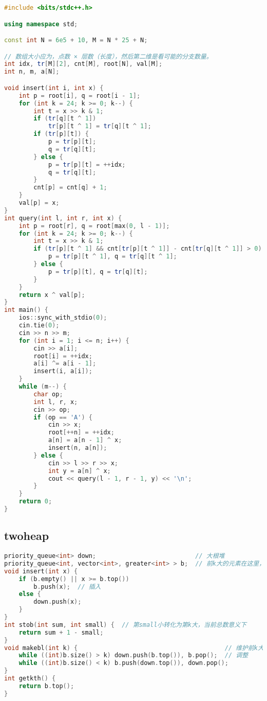 \begin{lstlisting}[language=C++]
#include <bits/stdc++.h>

using namespace std;

const int N = 6e5 + 10, M = N * 25 + N;

// 数组大小应为，点数 × 层数（长度），然后第二维是看可能的分支数量。
int idx, tr[M][2], cnt[M], root[N], val[M];
int n, m, a[N];

void insert(int i, int x) {
    int p = root[i], q = root[i - 1];
    for (int k = 24; k >= 0; k--) {
        int t = x >> k & 1;
        if (tr[q][t ^ 1])
            tr[p][t ^ 1] = tr[q][t ^ 1];
        if (tr[p][t]) {
            p = tr[p][t];
            q = tr[q][t];
        } else {
            p = tr[p][t] = ++idx;
            q = tr[q][t];
        }
        cnt[p] = cnt[q] + 1;
    }
    val[p] = x;
}
int query(int l, int r, int x) {
    int p = root[r], q = root[max(0, l - 1)];
    for (int k = 24; k >= 0; k--) {
        int t = x >> k & 1;
        if (tr[p][t ^ 1] && cnt[tr[p][t ^ 1]] - cnt[tr[q][t ^ 1]] > 0) {
            p = tr[p][t ^ 1], q = tr[q][t ^ 1];
        } else {
            p = tr[p][t], q = tr[q][t];
        }
    }
    return x ^ val[p];
}
int main() {
    ios::sync_with_stdio(0);
    cin.tie(0);
    cin >> n >> m;
    for (int i = 1; i <= n; i++) {
        cin >> a[i];
        root[i] = ++idx;
        a[i] ^= a[i - 1];
        insert(i, a[i]);
    }
    while (m--) {
        char op;
        int l, r, x;
        cin >> op;
        if (op == 'A') {
            cin >> x;
            root[++n] = ++idx;
            a[n] = a[n - 1] ^ x;
            insert(n, a[n]);
        } else {
            cin >> l >> r >> x;
            int y = a[n] ^ x;
            cout << query(l - 1, r - 1, y) << '\n';
        }
    }
    return 0;
}
\end{lstlisting}
\subsection{twoheap}
\begin{lstlisting}[language=C++]
priority_queue<int> down;                           // 大根堆
priority_queue<int, vector<int>, greater<int> > b;  // 前k大的元素在这里，第k大在堆顶
void insert(int x) {
    if (b.empty() || x >= b.top())
        b.push(x);  // 插入
    else {
        down.push(x);
    }
}
int stob(int sum, int small) {  // 第small小转化为第k大，当前总数意义下
    return sum + 1 - small;
}
void makebl(int k) {                                        // 维护前k大性质
    while ((int)b.size() > k) down.push(b.top()), b.pop();  // 调整
    while ((int)b.size() < k) b.push(down.top()), down.pop();
}
int getkth() {
    return b.top();
}
\end{lstlisting}
